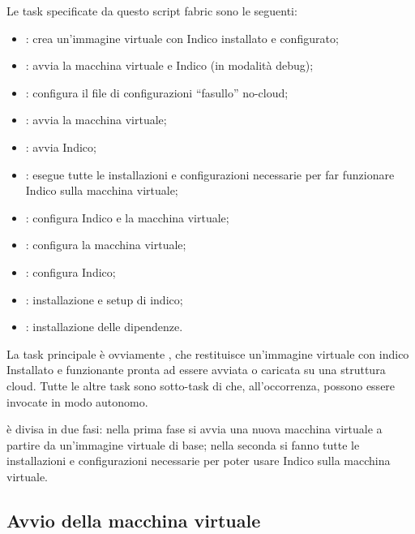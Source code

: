         Le task specificate da questo script fabric sono le seguenti:
        
        \begin{itemize}
            \item {}: crea un'immagine virtuale con Indico installato e configurato;
            \item {}: avvia la macchina virtuale e Indico (in modalità debug);
            \item {}: configura il file di configurazioni ``fasullo'' no-cloud;
            \item {}: avvia la macchina virtuale;
            \item {}: avvia Indico;
            \item {}: esegue tutte le installazioni e configurazioni necessarie per far funzionare Indico sulla macchina virtuale;
            \item {}: configura Indico e la macchina virtuale;
            \item {}: configura la macchina virtuale;
            \item {}: configura Indico;
            \item {}: installazione e setup di indico;
            \item {}: installazione delle dipendenze.
        \end{itemize}
        
        La task principale è ovviamente , che restituisce un'immagine virtuale con indico Installato e funzionante pronta ad essere avviata o caricata su una struttura cloud. Tutte le altre task sono sotto-task di  che, all'occorrenza, possono essere invocate in modo autonomo.
        
         è divisa in due fasi: nella prima fase si avvia una nuova macchina virtuale a partire da un'immagine virtuale di base; nella seconda si fanno tutte le installazioni e configurazioni necessarie per poter usare Indico sulla macchina virtuale.
        
        \subsection{Avvio della macchina virtuale} \label{subsec:cd;civ;avvio_macchina_virtuale}
        
